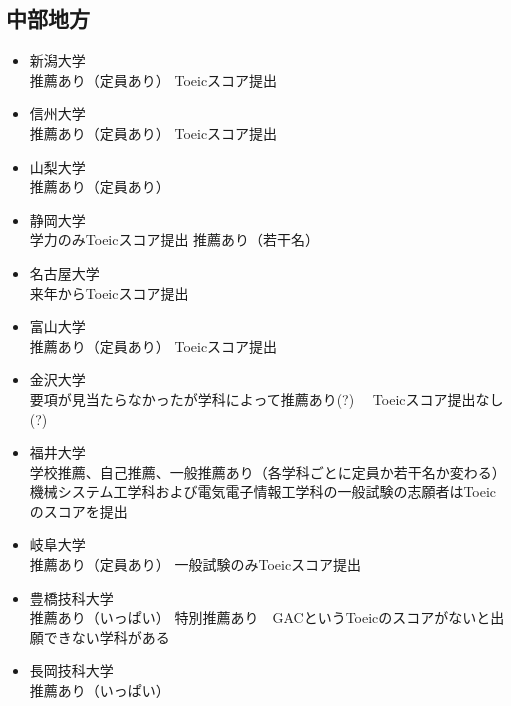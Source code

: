 \documentclass[platex, dvipdfmx, a4paper]{jarticle}
\begin{document}
      \subsection{中部地方}
        \begin{itemize}
          \item 新潟大学
            \\推薦あり（定員あり） Toeicスコア提出
          \item 信州大学
            \\推薦あり（定員あり） Toeicスコア提出
          \item 山梨大学
            \\推薦あり（定員あり）
          \item 静岡大学
            \\学力のみToeicスコア提出 推薦あり（若干名）
          \item 名古屋大学
            \\来年からToeicスコア提出
          \item 富山大学
            \\推薦あり（定員あり） Toeicスコア提出
          \item 金沢大学
            \\要項が見当たらなかったが学科によって推薦あり(?)　 Toeicスコア提出なし(?)
          \item 福井大学
            \\学校推薦、自己推薦、一般推薦あり（各学科ごとに定員か若干名か変わる）
            機械システム工学科および電気電子情報工学科の一般試験の志願者はToeicのスコアを提出
          \item 岐阜大学
            \\推薦あり（定員あり） 一般試験のみToeicスコア提出
          \item 豊橋技科大学
            \\推薦あり（いっぱい） 特別推薦あり　GACというToeicのスコアがないと出願できない学科がある
          \item 長岡技科大学
            \\推薦あり（いっぱい）
        \end{itemize}
\end{document}
